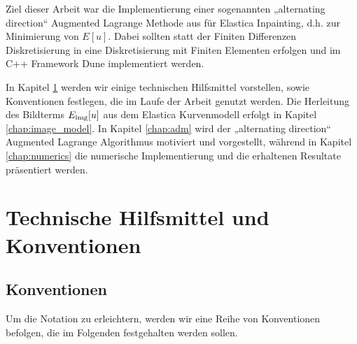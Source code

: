 \documentclass{mythesis}
\begin{document}
Ziel dieser Arbeit war die Implementierung einer sogenannten „alternating direction“ Augmented Lagrange Methode aus \cite{tai2011fast} für Elastica Inpainting, d.h. zur Minimierung von $E[u]$.
Dabei sollten statt der Finiten Differenzen Diskretisierung in \cite{tai2011fast} eine Diskretisierung mit Finiten Elementen erfolgen und im C++ Framework Dune \cite{dune-web-page,blatt2016distributed} implementiert werden.

In Kapitel \ref{chap:technical} werden wir einige technischen Hilfsmittel vorstellen, sowie Konventionen festlegen, die im Laufe der Arbeit genutzt werden.
Die Herleitung des Bildterms $E_{\mathrm{img}}[u]$ aus dem Elastica Kurvenmodell erfolgt in Kapitel \ref{chap:image_model}.
In Kapitel \ref{chap:adm} wird der „alternating direction“ Augmented Lagrange Algorithmus motiviert und vorgestellt, während in Kapitel \ref{chap:numerics} die numerische Implementierung und die erhaltenen Resultate präsentiert werden.


\chapter{Technische Hilfsmittel und Konventionen} \label{chap:technical}


\section*{Konventionen}

Um die Notation zu erleichtern, werden wir eine Reihe von Konventionen befolgen, die im Folgenden festgehalten werden sollen.
\end{document}
